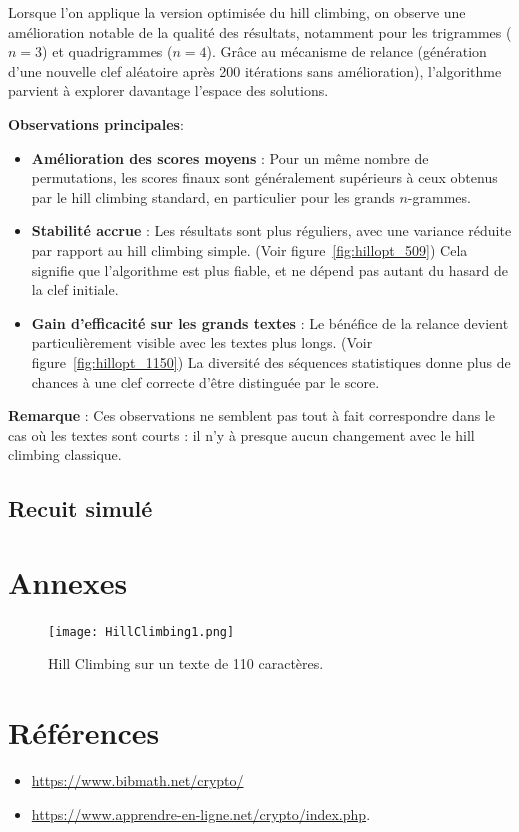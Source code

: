 \documentclass[a4paper]{article}
\begin{document}
Lorsque l’on applique la version optimisée du hill climbing, on observe une amélioration notable de la qualité des résultats, notamment pour les trigrammes ($n=3$) et quadrigrammes ($n=4$). Grâce au mécanisme de relance (génération d’une nouvelle clef aléatoire après 200 itérations sans amélioration), l’algorithme parvient à explorer davantage l’espace des solutions.

\textbf{Observations principales}:
\begin{itemize}
    \item \textbf{Amélioration des scores moyens} : Pour un même nombre de permutations, les scores finaux sont généralement supérieurs à ceux obtenus par le hill climbing standard, en particulier pour les grands $n$-grammes.
    
    \item \textbf{Stabilité accrue} : Les résultats sont plus réguliers, avec une variance réduite par rapport au hill climbing simple. (Voir figure~\ref{fig:hillopt_509}) Cela signifie que l’algorithme est plus fiable, et ne dépend pas autant du hasard de la clef initiale.
    
    \item \textbf{Gain d’efficacité sur les grands textes} : Le bénéfice de la relance devient particulièrement visible avec les textes plus longs. (Voir figure~\ref{fig:hillopt_1150}) La diversité des séquences statistiques donne plus de chances à une clef correcte d’être distinguée par le score.
\end{itemize}

\textbf{Remarque} : Ces observations ne semblent pas tout à fait correspondre dans le cas où les textes sont courts : il n'y à presque aucun changement avec le hill climbing classique.

\subsection{Recuit simulé}

\clearpage
\appendix
\section*{Annexes}
\label{sec:annexes}

\begin{figure}[H]
    \centering
    \texttt{[image: HillClimbing1.png]}
    \caption{Hill Climbing sur un texte de 110 caractères.}
    \label{fig:hill_110}
\end{figure}

\clearpage
\section*{Références}
\label{sec:bibliographie}

\begin{itemize}
    \item \url{https://www.bibmath.net/crypto/}
    \item \url{https://www.apprendre-en-ligne.net/crypto/index.php}.

\end{itemize}
\end{document}
